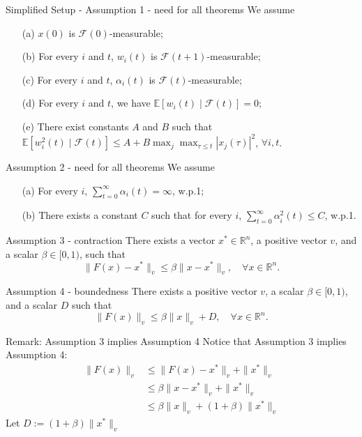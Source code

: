 \documentclass[aspectratio=169]{beamer} %
\begin{document}
\begin{frame}{Simplified Setup - Assumption 1 - need for all theorems}
We assume
    \begin{enumerate}
\item[(a)] $x(0)$ is $\mathcal{F}(0)$-measurable;
\item[(b)] For every $i$ and $t$, $w_i(t)$ is $\mathcal{F}(t+1)$-measurable;
\item[(c)] For every $i$ and $t$, $\alpha_i(t)$ is $\mathcal{F}(t)$-measurable;
\item[(d)] For every $i$ and $t$, we have $\mathbb{E}[w_i(t) \mid \mathcal{F}(t)] = 0$;
\item[(e)] There exist constants $A$ and $B$ such that
$\mathbb{E}[w_i^2(t) \mid \mathcal{F}(t)] \leq A + B \max_j \max_{\tau \leq t} |x_j(\tau)|^2$, $\forall i, t$.
\end{enumerate}
    
\end{frame}
\begin{frame}{Assumption 2 - need for all theorems}
We assume
\begin{enumerate}
\item[(a)] For every $i$, $\sum_{t=0}^{\infty} \alpha_i(t) = \infty$, w.p.1;
\item[(b)] There exists a constant $C$ such that for every $i$, $\sum_{t=0}^{\infty} \alpha_i^2(t) \leq C$, w.p.1.
\end{enumerate}
\end{frame}
\begin{frame}{Assumption 3 - contraction}
    There exists a vector $x^* \in \mathbb{R}^n$, a positive vector $v$, and a scalar $\beta \in [0,1)$, such that
\begin{equation}
\|F(x) - x^*\|_v \leq \beta \|x - x^*\|_v, \quad \forall x \in \mathbb{R}^n.
\end{equation}
\end{frame}
\begin{frame}{Assumption 4 - boundedness}
    There exists a positive vector $v$, a scalar $\beta \in [0,1)$, and a scalar $D$ such that
\begin{equation}
\|F(x)\|_v \leq \beta\|x\|_v + D, \quad \forall x \in \mathbb{R}^n.
\end{equation}
\end{frame}
\begin{frame}{Remark: Assumption 3 implies Assumption 4}
Notice that Assumption 3 implies Assumption 4:
        \begin{align*}
        \|F(x)\|_v &\le \|F(x)-x^*\|_v + \|x^*\|_v\tag{$\Delta$ ineq.}\\
        &\le \beta \|x-x^*\|_v+\|x^*\|_v\tag{Assumption 3}\\
        &\le \beta\|x\|_v + (1+\beta) \|x^*\|_v\tag{$\Delta$ ineq.}
    \end{align*}
    Let $D:= (1+\beta)\|x^*\|_v$
    
\end{frame}
\end{document}
